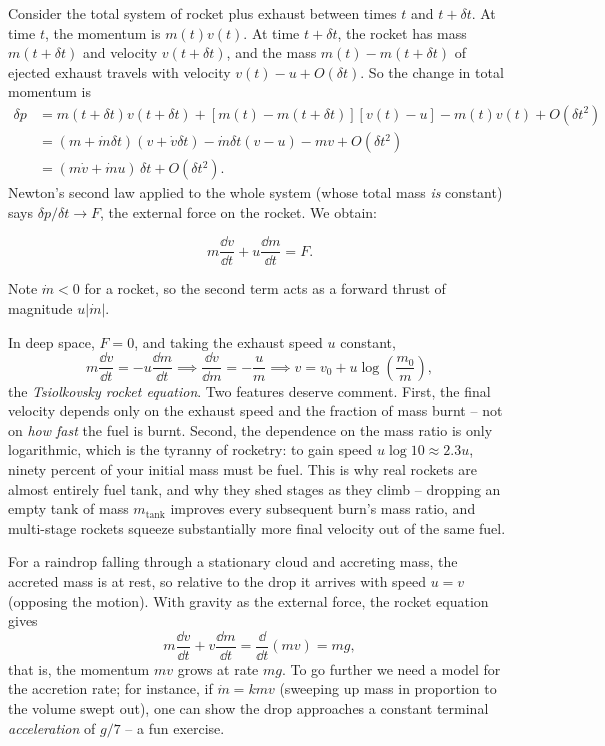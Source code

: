 \documentclass[a4paper]{scrartcl}
\begin{document}
Consider the total system of rocket plus exhaust between times $t$ and $t + \delta t$. At time $t$, the momentum is $m(t)v(t)$. At time $t + \delta t$, the rocket has mass $m(t + \delta t)$ and velocity $v(t + \delta t)$, and the mass $m(t) - m(t + \delta t)$ of ejected exhaust travels with velocity $v(t) - u + O(\delta t)$. So the change in total momentum is
\begin{align*}
	\delta p &= m(t + \delta t)v(t + \delta t) + \left[m(t) - m(t+\delta t)\right]\left[v(t) - u\right] - m(t)v(t) + O(\delta t^2)\\
	&= (m + \dot{m}\delta t)(v + \dot{v}\delta t) - \dot{m}\delta t (v - u) - mv + O(\delta t^2)\\
	&= (m \dot{v} + \dot{m} u)\, \delta t + O(\delta t^2).
\end{align*}
Newton's second law applied to the whole system (whose total mass \emph{is} constant) says $\delta p / \delta t \to F$, the external force on the rocket. We obtain:

\begin{proposition}
	$$
	m \frac{\dd v}{\dd t} + u \frac{\dd m}{\dd t} = F.
	$$
\end{proposition}

Note $\dot{m} < 0$ for a rocket, so the second term acts as a forward thrust of magnitude $u|\dot m|$.

\begin{example}
	In deep space, $F = 0$, and taking the exhaust speed $u$ constant,
	$$
	m \frac{\dd v}{\dd t} = -u \frac{\dd m}{\dd t} \implies \frac{\dd v}{\dd m} = -\frac{u}{m} \implies v = v_0 + u \log\left(\frac{m_0}{m}\right),
	$$
	the \emph{Tsiolkovsky rocket equation}. Two features deserve comment. First, the final velocity depends only on the exhaust speed and the fraction of mass burnt -- not on \emph{how fast} the fuel is burnt. Second, the dependence on the mass ratio is only logarithmic, which is the tyranny of rocketry: to gain speed $u \log 10 \approx 2.3u$, ninety percent of your initial mass must be fuel. This is why real rockets are almost entirely fuel tank, and why they shed stages as they climb -- dropping an empty tank of mass $m_{\text{tank}}$ improves every subsequent burn's mass ratio, and multi-stage rockets squeeze substantially more final velocity out of the same fuel.
\end{example}

\begin{example}
	For a raindrop falling through a stationary cloud and accreting mass, the accreted mass is at rest, so relative to the drop it arrives with speed $u = v$ (opposing the motion). With gravity as the external force, the rocket equation gives
	$$
	m \frac{\dd v}{\dd t} + v\frac{\dd m}{\dd t} = \frac{\dd}{\dd t}(m v) = mg,
	$$
	that is, the momentum $mv$ grows at rate $mg$. To go further we need a model for the accretion rate; for instance, if $\dot m = k m v$ (sweeping up mass in proportion to the volume swept out), one can show the drop approaches a constant terminal \emph{acceleration} of $g/7$ -- a fun exercise.
\end{example}
\end{document}
